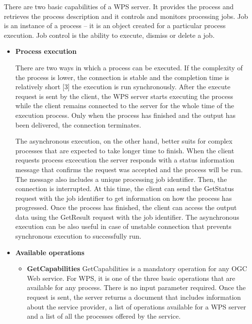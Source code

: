 

There are two basic capabilities of a WPS server. It provides the process and retrieves the process description and it controls and monitors processing jobs. Job is an instance of a process – it is an object created for a particular process execution. Job control is the ability to execute, dismiss or delete a job.

\begin{itemize}
\item \textbf{Process execution}


There are two ways in which a process can be executed. If the complexity of the process is lower, the connection is stable and the completion time is relatively short [3] the execution is run synchronously. After the execute request is sent by the client, the WPS server starts executing the process while the client remains connected to the server for the whole time of the execution process. Only when the process has finished and the output has been delivered, the connection terminates.\par
The asynchronous execution, on the other hand, better suits for complex processes that are expected to take longer time to finish. When the client requests process excecution the server responds with a status information message that confirms the request was accepted and the process will be run. The message also includes a unique processing job identifier. Then, the connection is interrupted. At this time, the client can send the GetStatus request with the job identifier to get information on how the process has progressed. Once the process has finished, the client can access the output data using the GetResult request with the job identifier. The asynchronous execution can be also useful in case of unstable connection that prevents synchronous execution to successfully run.

\item \textbf{Available operations}

\begin{itemize}

\item \textbf{GetCapabilities}
GetCapabilities is a mandatory operation for any OGC Web service. For WPS, it is one of the three basic operations that are available for any process. There is no input parameter required. Once the request is sent, the server returns a document that includes information about the service provider, a list of operations available for a WPS server and a list of all the processes offered by the service.


\end{itemize}
\end{itemize}
